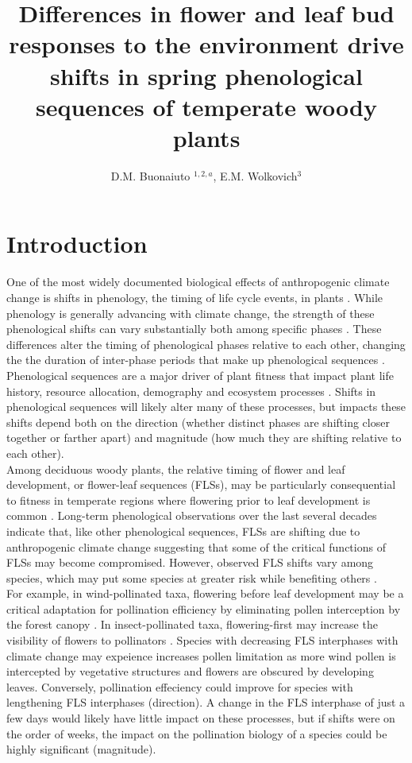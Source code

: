 \documentclass[11pt]{article}
\title{Differences in flower and leaf bud responses to the environment drive shifts in spring phenological sequences of temperate woody plants}\\
\date{}
\author{D.M. Buonaiuto $^{1,2,a}$, E.M. Wolkovich$^{3}$}
\begin{document}
\maketitle
\section*{Introduction}
One of the most widely documented biological effects of anthropogenic climate change is shifts in phenology, the timing of life cycle events, in plants \citep{}. While phenology is generally advancing with climate change, the strength of these phenological shifts can vary substantially both among specific phases \citep{}. These differences alter the timing of phenological phases relative to each other, changing the the duration of inter-phase periods that make up phenological sequences \citep{}. Phenological sequences are a major driver of plant fitness that impact plant life history, resource allocation, demography and ecosystem processes \citep{}. Shifts in phenological sequences will likely alter many of these processes, but impacts these shifts depend both on the direction (whether distinct phases are shifting closer together or farther apart) and magnitude (how much they are shifting relative to each other).\\

Among deciduous woody plants, the relative timing of flower and leaf development, or flower-leaf sequences (FLSs), may be particularly consequential to fitness in temperate regions where flowering prior to leaf development is common \citep{Rathcke_1985,Gougherty2018}. Long-term phenological observations over the last several decades indicate that, like other phenological sequences, FLSs are shifting due to anthropogenic climate change \citep{Buonaiuto2020} suggesting that some of the critical functions of FLSs may become compromised. However, observed FLS shifts vary among species, which may put some species at greater risk while benefiting others \citep{Buonaiuto2020}.\\  

For example, in wind-pollinated taxa, flowering before leaf development may be a critical adaptation for pollination efficiency by eliminating pollen interception by the forest canopy \citep{Whitehead1969}. In insect-pollinated taxa, flowering-first may increase the visibility of flowers to pollinators \citep{Janzen1967,Savage2019}. Species with decreasing FLS interphases with climate change may expeience increases pollen limitation as more wind pollen is intercepted by vegetative structures and flowers are obscured by developing leaves. Conversely, pollination effeciency could improve for species with lengthening FLS interphases (direction). A change in the FLS interphase of just a few days would likely have little impact on these processes, but if shifts were on the order of weeks, the impact on the pollination biology of a species could be highly significant (magnitude).\\
\end{document}
